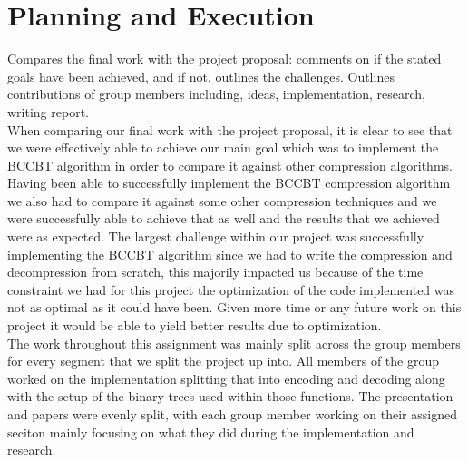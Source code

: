 \documentclass[12pt]{IEEEtran}
\begin{document}
\section{Planning and Execution}
Compares the final work with the project proposal: comments on if the stated goals have been achieved, and if not, outlines the challenges.
Outlines contributions of group members including, ideas, implementation, research, writing report.\\

When comparing our final work with the project proposal, it is clear to see that we were effectively able
to achieve our main goal which was to implement the BCCBT algorithm in order to compare it against other
compression algorithms.  Having been able to successfully implement the BCCBT compression algorithm we 
also had to compare it against some other compression techniques and we were successfully able to achieve 
that as well and the results that we achieved were as expected.  The largest challenge within our
project was successfully implementing the BCCBT algorithm since we had to write the compression and 
decompression from scratch, this majorily impacted us because of the time constraint we had for this 
project the optimization of the code implemented was not as optimal as it could have been.  Given more 
time or any future work on this project it would be able to yield better results due to optimization.\\

The work throughout this assignment was mainly split across the group members for every segment that 
we split the project up into.  All members of the group worked on the implementation splitting that 
into encoding and decoding along with the setup of the binary trees used within those functions.  The 
presentation and papers were evenly split, with each group member working on their assigned seciton mainly
focusing on what they did during the implementation and research.




\end{document}
